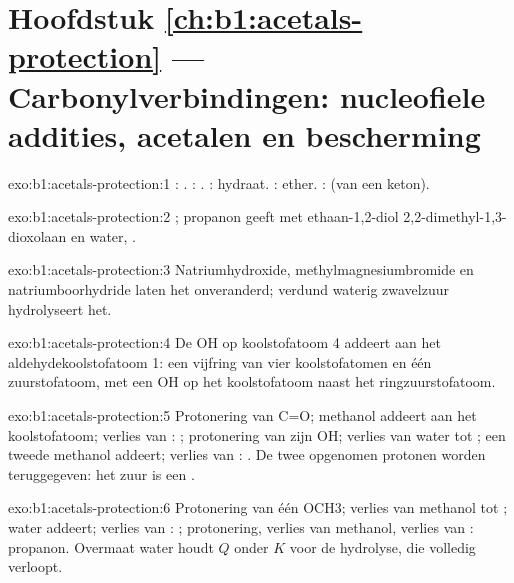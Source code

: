 \section*{Hoofdstuk \ref{ch:b1:acetals-protection} --- Carbonylverbindingen: nucleofiele addities, acetalen en bescherming}

\begin{solution}{exo:b1:acetals-protection:1}
: . : .
: hydraat. : ether. :
 (van een keton).
\end{solution}

\begin{solution}{exo:b1:acetals-protection:2}
; propanon geeft met
ethaan-1,2-diol 2,2-dimethyl-1,3-dioxolaan en water,
.
\end{solution}

\begin{solution}{exo:b1:acetals-protection:3}
Natriumhydroxide, methylmagnesiumbromide en natriumboorhydride laten het
onveranderd; verdund waterig zwavelzuur hydrolyseert het.
\end{solution}

\begin{solution}{exo:b1:acetals-protection:4}
De OH op koolstofatoom 4 addeert aan het aldehydekoolstofatoom 1: een
vijfring van vier koolstofatomen en één zuurstofatoom, met een OH op het
koolstofatoom naast het ringzuurstofatoom.
\end{solution}

\begin{solution}{exo:b1:acetals-protection:5}
Protonering van C=O; methanol addeert aan het koolstofatoom; verlies van
: ; protonering van zijn OH; verlies van water tot
; een tweede methanol addeert; verlies van :
. De twee opgenomen protonen worden teruggegeven: het
zuur is een .
\end{solution}

\begin{solution}{exo:b1:acetals-protection:6}
Protonering van één OCH3; verlies van methanol tot ;
water addeert; verlies van : ; protonering, verlies van
methanol, verlies van : propanon. Overmaat water houdt $Q$ onder
$K$ voor de hydrolyse, die volledig verloopt.
\end{solution}

